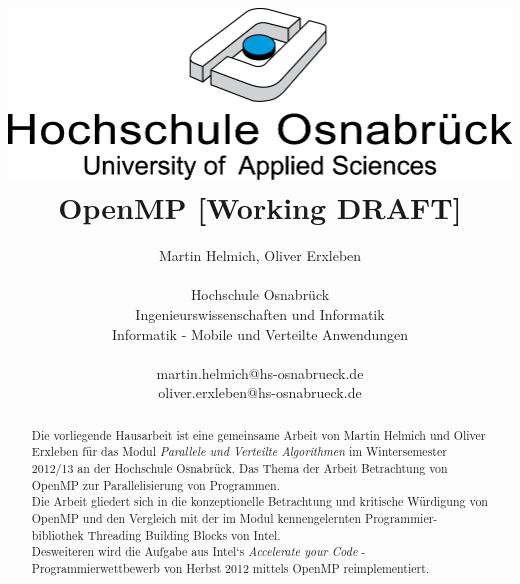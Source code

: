 \documentclass{lni}
\begin{document}
\author{
	Martin Helmich, Oliver Erxleben \\ 
	\\ 
	Hochschule Osnabrück \\ 
	Ingenieurswissenschaften und Informatik \\ 
	Informatik - Mobile und Verteilte Anwendungen \\ 
	\\ 
	martin.helmich@hs-osnabrueck.de \\
	oliver.erxleben@hs-osnabrueck.de
}

\title{\includegraphics[scale=0.75,keepaspectratio]{img/hs_os.png}\linebreak \linebreak OpenMP [Working DRAFT]}

\maketitle

\tableofcontents

\begin{abstract}
Die vorliegende Hausarbeit ist eine gemeinsame Arbeit von Martin Helmich und Oliver Erxleben für das Modul \textit{Parallele und Verteilte Algorithmen} im Wintersemester 2012/13 an der Hochschule Osnabrück. Das Thema der Arbeit Betrachtung von OpenMP zur Parallelisierung von Programmen. \\ 
Die Arbeit gliedert sich in die konzeptionelle Betrachtung und kritische Würdigung von OpenMP und den Vergleich mit der im Modul kennengelernten Programmier- \\ bibliothek Threading Building Blocks von Intel. \\
Desweiteren wird die Aufgabe aus Intel`s \textit{Accelerate your Code} - Programmierwettbewerb von Herbst 2012 mittels OpenMP reimplementiert.
\end{abstract}

\pagebreak %

\setcounter{page}{1} %
\end{document}
